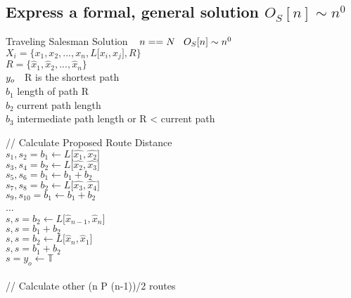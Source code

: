 \documentclass[11pt]{article}
\begin{document}
\subsection{Express a formal, general solution $O_S[n] \sim n^0$}
\begin{center}
\vspace{2mm}Traveling Salesman Solution $\hspace{3mm} n == N \hspace{3mm} O_S[n] \sim n^0
$
\\ \vspace{2mm}
$
X_i = \{x_1,x_2,...,x_n,L \lbrack x_i,x_j \rbrack,R\}
$
\\ \vspace{2mm}
$
R = \{\hat{x}_1,\hat{x}_2,...,\hat{x}_n\}
$
\\ \vspace{2mm}
$
y_o \hspace{2mm}$ R is the shortest path
\\ \vspace{2mm}
$
b_1$ length of path R
\\ \vspace{2mm}
$
b_2$ current path length
\\ \vspace{2mm}
$
b_3$ intermediate path length or R < current path
\end{center}
\vspace{4mm}// Calculate Proposed Route Distance\\
$s_1,s_2 = b_1 \leftarrow L \lbrack \hat{x_1},\hat{x_2} \rbrack$\\
$s_3,s_4 = b_2 \leftarrow L \lbrack \hat{x_2},\hat{x_3} \rbrack$\\
$s_5,s_6 = b_1 \leftarrow b_1 + b_2$\\
$s_7,s_8 = b_2 \leftarrow L \lbrack \hat{x_3},\hat{x_4} \rbrack$\\
$s_9,s_{10} = b_1 \leftarrow b_1 + b_2$\\
...\\
$s,s = b_2 \leftarrow L \lbrack \hat{x}_{n-1}, \hat{x}_n \rbrack$\\
$s,s = b_1 + b_2$\\
$s,s = b_2 \leftarrow L \lbrack \hat{x}_{n}, \hat{x}_1 \rbrack$\\
$s,s = b_1 + b_2$\\
$s = y_o \leftarrow \mathbb{T}$\\ \\
// Calculate other (n P (n-1))/2 routes\\
\end{document}
